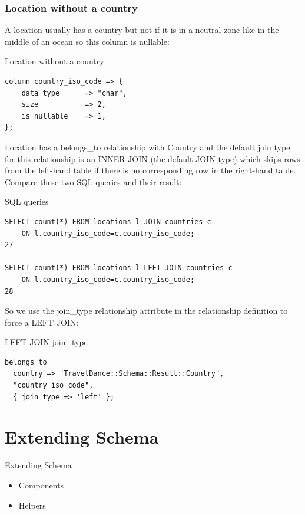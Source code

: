 \subsubsection{Location without a country}

A location usually has a country but not if it is in a neutral zone like in
the middle of an ocean so this column is nullable:

\begin{frame}[fragile]{Location without a country}
\begin{lstlisting}
column country_iso_code => {
    data_type      => "char",
    size           => 2,
    is_nullable    => 1,
};
\end{lstlisting}
\end{frame}

Location has a belongs\_to relationship with Country and the default join
type for this relationship is an INNER JOIN (the default JOIN type) which
skips rows from the left-hand table if there is no corresponding row in the
right-hand table. Compare these two SQL queries and their result: 

\begin{frame}[fragile]{SQL queries}
\begin{lstlisting}
SELECT count(*) FROM locations l JOIN countries c
    ON l.country_iso_code=c.country_iso_code;
27

SELECT count(*) FROM locations l LEFT JOIN countries c
    ON l.country_iso_code=c.country_iso_code;
28
\end{lstlisting}
\end{frame}

So we use the join\_type relationship attribute in the relationship definition to force a LEFT JOIN:

\begin{frame}[fragile]{LEFT JOIN join\_type}
\begin{lstlisting}
belongs_to
  country => "TravelDance::Schema::Result::Country",
  "country_iso_code",
  { join_type => 'left' };
\end{lstlisting}
\end{frame}

\section{Extending Schema}
\begin{frame}{Extending Schema}
\begin{itemize}
\item Components
\item Helpers
\end{itemize}
\end{frame}

